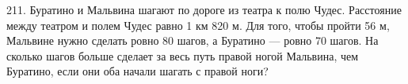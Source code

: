 211. Буратино и Мальвина шагают по дороге из театра к полю Чудес. Расстояние между театром и полем Чудес равно 1 км 820 м. Для того, чтобы пройти 56 м, Мальвине нужно сделать ровно 80 шагов, а Буратино --- ровно 70 шагов. На сколько шагов больше сделает за весь путь правой ногой Мальвина, чем Буратино, если они оба начали шагать с правой ноги?\\
